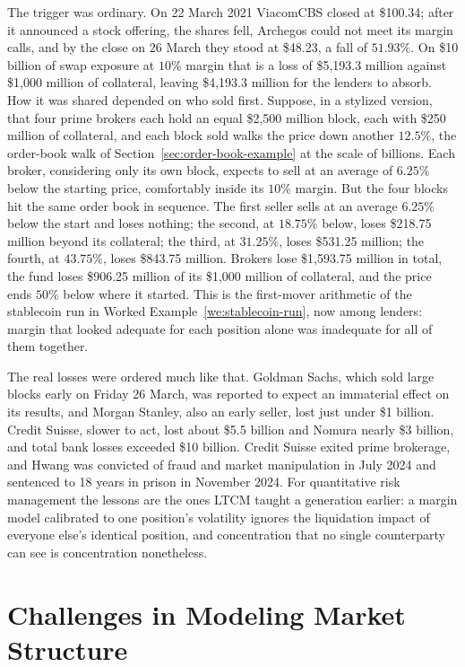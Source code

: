 \documentclass[../ai_in_finance]{subfiles}
\begin{document}
The trigger was ordinary. On 22 March 2021 ViacomCBS closed at \$100.34; after it announced a stock offering, the shares fell, Archegos could not meet its margin calls, and by the close on 26 March they stood at \$48.23, a fall of $51.93\%$. On \$10 billion of swap exposure at $10\%$ margin that is a loss of \$5,193.3 million against \$1,000 million of collateral, leaving \$4,193.3 million for the lenders to absorb. How it was shared depended on who sold first. Suppose, in a stylized version, that four prime brokers each hold an equal \$2,500 million block, each with \$250 million of collateral, and each block sold walks the price down another $12.5\%$, the order-book walk of Section~\ref{sec:order-book-example} at the scale of billions. Each broker, considering only its own block, expects to sell at an average of $6.25\%$ below the starting price, comfortably inside its $10\%$ margin. But the four blocks hit the same order book in sequence. The first seller sells at an average $6.25\%$ below the start and loses nothing; the second, at $18.75\%$ below, loses \$218.75 million beyond its collateral; the third, at $31.25\%$, loses \$531.25 million; the fourth, at $43.75\%$, loses \$843.75 million. Brokers lose \$1,593.75 million in total, the fund loses \$906.25 million of its \$1,000 million of collateral, and the price ends $50\%$ below where it started. This is the first-mover arithmetic of the stablecoin run in Worked Example~\ref{we:stablecoin-run}, now among lenders: margin that looked adequate for each position alone was inadequate for all of them together.

The real losses were ordered much like that. Goldman Sachs, which sold large blocks early on Friday 26 March, was reported to expect an immaterial effect on its results, and Morgan Stanley, also an early seller, lost just under \$1 billion. Credit Suisse, slower to act, lost about \$5.5 billion and Nomura nearly \$3 billion, and total bank losses exceeded \$10 billion. Credit Suisse exited prime brokerage, and Hwang was convicted of fraud and market manipulation in July 2024 and sentenced to 18 years in prison in November 2024. For quantitative risk management the lessons are the ones LTCM taught a generation earlier: a margin model calibrated to one position's volatility ignores the liquidation impact of everyone else's identical position, and concentration that no single counterparty can see is concentration nonetheless.

\section{Challenges in Modeling Market Structure}
\label{sec:markets-challenges}
\end{document}
